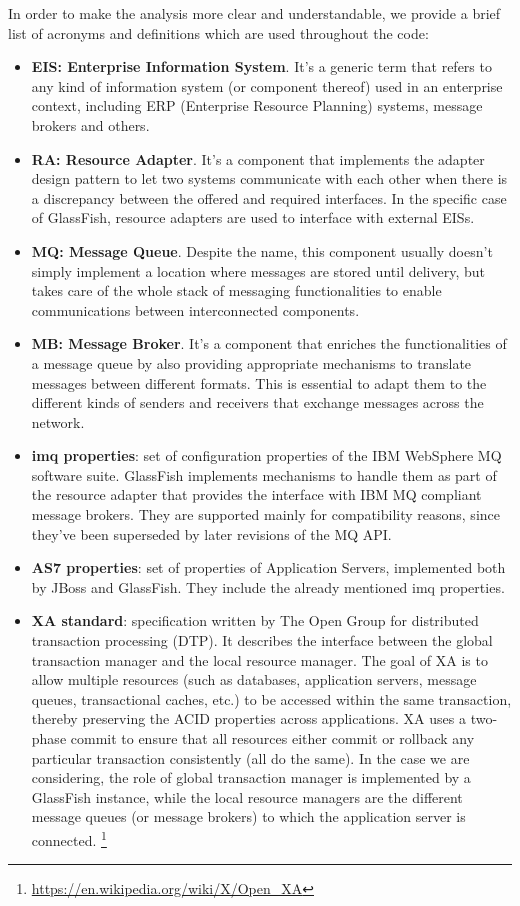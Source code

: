 In order to make the analysis more clear and understandable, we provide a brief list of acronyms and definitions which are used throughout the code:
\begin{itemize}
	\item \textbf{EIS: Enterprise Information System}. It's a generic term that refers to any kind of information system (or component thereof) used in an enterprise context, including ERP (Enterprise Resource Planning) systems, message brokers and others.
	\item \textbf{RA: Resource Adapter}. It's a component that implements the adapter design pattern to let two systems communicate with each other when there is a discrepancy between the offered and required interfaces. In the specific case of GlassFish, resource adapters are used to interface with external EISs.
	\item \textbf{MQ: Message Queue}. Despite the name, this component usually doesn't simply implement a location where messages are stored until delivery, but takes care of the whole stack of messaging functionalities to enable communications between interconnected components. 
	\item \textbf{MB: Message Broker}. It's a component that enriches the functionalities of a message queue by also providing appropriate mechanisms to translate messages between different formats. This is essential to adapt them to the different kinds of senders and receivers that exchange messages across the network. 
	\item \textbf{imq properties}: set of configuration properties of the IBM WebSphere MQ software suite. GlassFish implements mechanisms to handle them as part of the resource adapter that provides the interface with IBM MQ compliant message brokers. They are supported mainly for compatibility reasons, since they've been superseded by later revisions of the MQ API. 
	\item \textbf{AS7 properties}: set of properties of Application Servers, implemented both by JBoss and GlassFish. They include the already mentioned imq properties. 
	\item \textbf{XA standard}: specification written by The Open Group for distributed transaction processing (DTP). It describes the interface between the global transaction manager and the local resource manager. The goal of XA is to allow multiple resources (such as databases, application servers, message queues, transactional caches, etc.) to be accessed within the same transaction, thereby preserving the ACID properties across applications. XA uses a two-phase commit to ensure that all resources either commit or rollback any particular transaction consistently (all do the same). In the case we are considering, the role of global transaction manager is implemented by a GlassFish instance, while the local resource managers are the different message queues (or message brokers) to which the application server is connected. \footnote{\url{https://en.wikipedia.org/wiki/X/Open_XA}}

\end{itemize}
